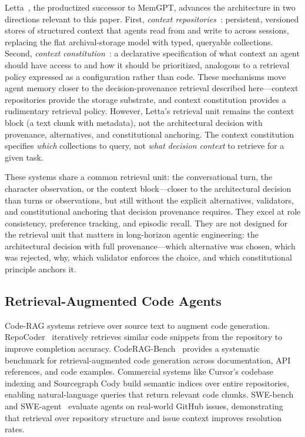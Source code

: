 \documentclass[11pt]{article}
\begin{document}
Letta~\citep{letta2025lettacode}, the productized successor to MemGPT, advances the architecture in two directions relevant to this paper.
First, \emph{context repositories}~\citep{letta2026repositories}: persistent, versioned stores of structured context that agents read from and write to across sessions, replacing the flat archival-storage model with typed, queryable collections.
Second, \emph{context constitution}~\citep{letta2026constitution}: a declarative specification of what context an agent should have access to and how it should be prioritized, analogous to a retrieval policy expressed as a configuration rather than code.
These mechanisms move agent memory closer to the decision-provenance retrieval described here---context repositories provide the storage substrate, and context constitution provides a rudimentary retrieval policy.
However, Letta's retrieval unit remains the context block (a text chunk with metadata), not the architectural decision with provenance, alternatives, and constitutional anchoring.
The context constitution specifies \emph{which} collections to query, not \emph{what decision context} to retrieve for a given task.

These systems share a common retrieval unit: the conversational turn, the character observation, or the context block---closer to the architectural decision than turns or observations, but still without the explicit alternatives, validators, and constitutional anchoring that decision provenance requires.
They excel at role consistency, preference tracking, and episodic recall.
They are not designed for the retrieval unit that matters in long-horizon agentic engineering: the architectural decision with full provenance---which alternative was chosen, which was rejected, why, which validator enforces the choice, and which constitutional principle anchors it.

\subsection{Retrieval-Augmented Code Agents}
\label{sec:related-code-rag}

Code-RAG systems retrieve over source text to augment code generation.
RepoCoder~\citep{zhang2023repocoder} iteratively retrieves similar code snippets from the repository to improve completion accuracy.
CodeRAG-Bench~\citep{wang2024coderagbench} provides a systematic benchmark for retrieval-augmented code generation across documentation, API references, and code examples.
Commercial systems like Cursor's codebase indexing and Sourcegraph Cody build semantic indices over entire repositories, enabling natural-language queries that return relevant code chunks.
SWE-bench~\citep{jimenez2024swebench} and SWE-agent~\citep{yang2024sweagent} evaluate agents on real-world GitHub issues, demonstrating that retrieval over repository structure and issue context improves resolution rates.
\end{document}
